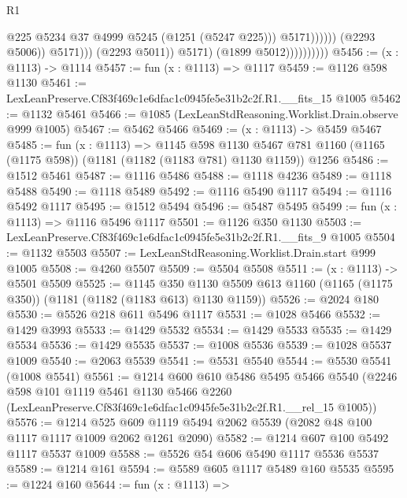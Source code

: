 \begin{lexlean}{R1}
\begin{coremodule}
                                                @225
                                                @5234
                                                @37
                                                @4999
                                                @5245
                                                (@1251 (@5247 @225)))
                                              @5171))))))
                                  (@2293 @5006))
                                @5171)))
                          (@2293 @5011))
                        @5171)
                      (@1899 @5012))))))))))
@5456 := (x : @1113) -> @1114
@5457 := fun (x : @1113) => @1117
@5459 := @1126 @598 @1130
@5461 := LexLeanPreserve.Cf83f469c1e6dfac1c0945fe5e31b2c2f.R1.__fits_15 @1005
@5462 := @1132 @5461
@5466 := @1085 (LexLeanStdReasoning.Worklist.Drain.observe @999 @1005)
@5467 := @5462 @5466
@5469 := (x : @1113) -> @5459 @5467
@5485 := fun (x : @1113) =>
  @1145
    @598
    @1130
    @5467
    @781
    @1160
    (@1165 (@1175 @598))
    (@1181 (@1182 (@1183 @781) @1130 @1159))
    @1256
@5486 := @1512 @5461
@5487 := @1116 @5486
@5488 := @1118 @4236
@5489 := @1118 @5488
@5490 := @1118 @5489
@5492 := @1116 @5490 @1117
@5494 := @1116 @5492 @1117
@5495 := @1512 @5494
@5496 := @5487 @5495
@5499 := fun (x : @1113) => @1116 @5496 @1117
@5501 := @1126 @350 @1130
@5503 := LexLeanPreserve.Cf83f469c1e6dfac1c0945fe5e31b2c2f.R1.__fits_9 @1005
@5504 := @1132 @5503
@5507 := LexLeanStdReasoning.Worklist.Drain.start @999 @1005
@5508 := @4260 @5507
@5509 := @5504 @5508
@5511 := (x : @1113) -> @5501 @5509
@5525 := @1145
    @350
    @1130
    @5509
    @613
    @1160
    (@1165 (@1175 @350))
    (@1181 (@1182 (@1183 @613) @1130 @1159))
@5526 := @2024 @180
@5530 := @5526 @218 @611 @5496 @1117
@5531 := @1028 @5466
@5532 := @1429 @3993
@5533 := @1429 @5532
@5534 := @1429 @5533
@5535 := @1429 @5534
@5536 := @1429 @5535
@5537 := @1008 @5536
@5539 := @1028 @5537 @1009
@5540 := @2063 @5539
@5541 := @5531 @5540
@5544 := @5530 @5541 (@1008 @5541)
@5561 := @1214
    @600
    @610
    @5486
    @5495
    @5466
    @5540
    (@2246
      @598
      @101
      @1119
      @5461
      @1130
      @5466
      @2260
      (LexLeanPreserve.Cf83f469c1e6dfac1c0945fe5e31b2c2f.R1.__rel_15 @1005))
@5576 := @1214
    @525
    @609
    @1119
    @5494
    @2062
    @5539
    (@2082 @48 @100 @1117 @1117 @1009 @2062 @1261 @2090)
@5582 := @1214 @607 @100 @5492 @1117 @5537 @1009
@5588 := @5526 @54 @606 @5490 @1117 @5536 @5537
@5589 := @1214 @161
@5594 := @5589 @605 @1117 @5489 @160 @5535
@5595 := @1224 @160
@5644 := fun (x : @1113) =>

\end{coremodule}
\end{lexlean}
